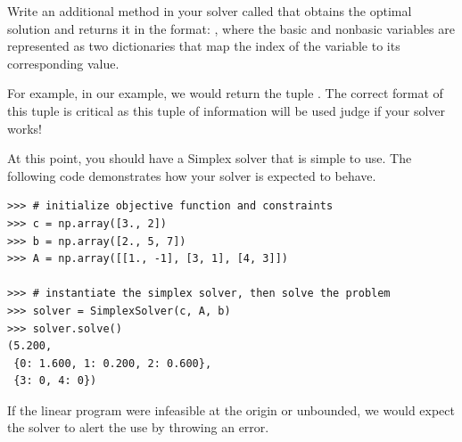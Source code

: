 \begin{problem}
Write an additional method in your solver called  that obtains the optimal solution and returns it in the format: , where the basic and nonbasic variables are represented as two dictionaries that map the index of the variable to 
its corresponding value.

For example, in our example, we would return the tuple . 
The correct format of this tuple is critical as this tuple of information will be used judge if your solver works!
\end{problem}

At this point, you should have a Simplex solver that is simple to use. The following code demonstrates how your solver is 
expected to behave.

\begin{lstlisting}
>>> # initialize objective function and constraints
>>> c = np.array([3., 2])
>>> b = np.array([2., 5, 7])
>>> A = np.array([[1., -1], [3, 1], [4, 3]])

>>> # instantiate the simplex solver, then solve the problem
>>> solver = SimplexSolver(c, A, b)
>>> solver.solve()
(5.200,
 {0: 1.600, 1: 0.200, 2: 0.600},
 {3: 0, 4: 0})
\end{lstlisting}

If the linear program were infeasible at the origin or unbounded, we would expect the solver to alert the use by throwing an error.


